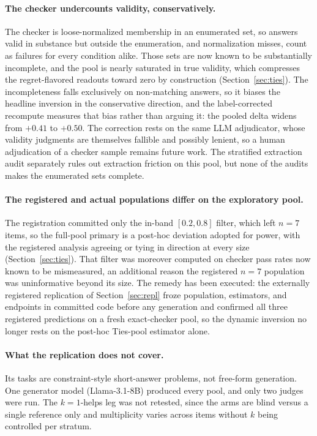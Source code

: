 \documentclass[11pt]{article}
\begin{document}
\paragraph{The checker undercounts validity, conservatively.}
The checker is loose-normalized membership in an enumerated set, so answers valid in substance but outside the enumeration, and normalization misses, count as failures for every condition alike.
Those sets are now known to be substantially incomplete, and the pool is nearly saturated in true validity, which compresses the regret-flavored readouts toward zero by construction (Section~\ref{sec:ties}).
The incompleteness falls exclusively on non-matching answers, so it biases the headline inversion in the conservative direction, and the label-corrected recompute measures that bias rather than arguing it: the pooled delta widens from $+0.41$ to $+0.50$.
The correction rests on the same LLM adjudicator, whose validity judgments are themselves fallible and possibly lenient, so a human adjudication of a checker sample remains future work.
The stratified extraction audit separately rules out extraction friction on this pool, but none of the audits makes the enumerated sets complete.

\paragraph{The registered and actual populations differ on the exploratory pool.}
The registration committed only the in-band $[0.2, 0.8]$ filter, which left $n{=}7$ items, so the full-pool primary is a post-hoc deviation adopted for power, with the registered analysis agreeing or tying in direction at every size (Section~\ref{sec:ties}).
That filter was moreover computed on checker pass rates now known to be mismeasured, an additional reason the registered $n{=}7$ population was uninformative beyond its size.
The remedy has been executed: the externally registered replication of Section~\ref{sec:repl} froze population, estimators, and endpoints in committed code before any generation and confirmed all three registered predictions on a fresh exact-checker pool, so the dynamic inversion no longer rests on the post-hoc Ties-pool estimator alone.

\paragraph{What the replication does not cover.}
Its tasks are constraint-style short-answer problems, not free-form generation.
One generator model (Llama-3.1-8B) produced every pool, and only two judges were run.
The $k{=}1$-helps leg was not retested, since the arms are blind versus a single reference only and multiplicity varies across items without $k$ being controlled per stratum.
\end{document}
